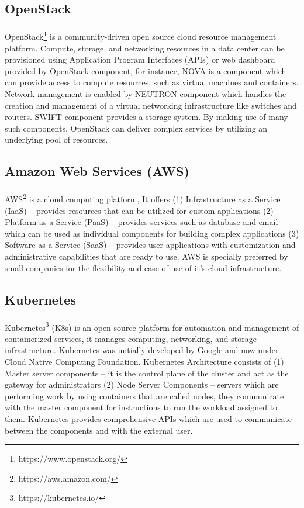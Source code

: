 \subsection{OpenStack}
\paragraph{}
OpenStack\footnote{https://www.openstack.org/} is a community-driven open source cloud resource management platform. Compute, storage, and networking resources in a data center can be provisioned using Application Program Interfaces (APIs) or web dashboard provided by OpenStack component, for instance, NOVA is a component which can provide access to compute resources, such as virtual machines and containers. Network management is enabled by NEUTRON component which handles the creation and management of a virtual networking infrastructure like switches and routers. SWIFT component provides a storage system. By making use of many such components, OpenStack can deliver complex services by utilizing an underlying pool of resources.
\subsection{Amazon Web Services (AWS)}
\paragraph{}
AWS\footnote{https://aws.amazon.com/} is a cloud computing platform, It offers (1) Infrastructure as a Service (IaaS) -- provides resources that can be utilized for custom applications (2) Platform as a Service (PaaS) -- provides services such as database and email which can be used as individual components for building complex applications (3) Software as a Service (SaaS) -- provides user applications with customization and administrative capabilities that are ready to use. AWS is specially preferred by small companies for the flexibility and ease of use of it's cloud infrastructure.
\subsection{Kubernetes}
\paragraph{}
Kubernetes\footnote{https://kubernetes.io/} (K8s) is an open-source platform for automation and management of containerized services, it manages computing, networking, and storage infrastructure. Kubernetes was initially developed by Google and now under Cloud Native Computing Foundation. Kubernetes Architecture consists of (1) Master server components -- it is the control plane of the cluster and act as the gateway for  administrators (2) Node Server Components -- servers which are performing work by using containers that are called nodes, they communicate with the master component for instructions to run the workload assigned to them. Kubernetes provides comprehensive APIs which are used to communicate between the components and with the external user.



